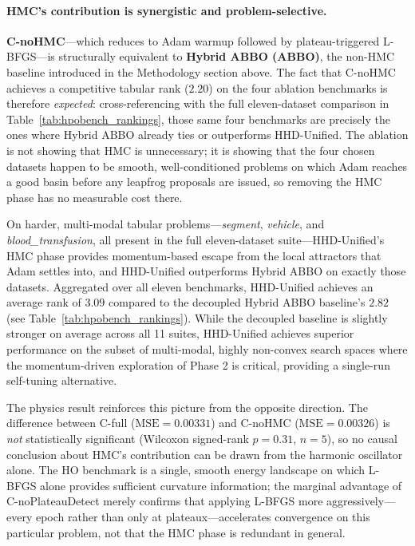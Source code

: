 \documentclass[11pt]{article}
\theoremstyle{definition}
\begin{document}
\paragraph{HMC's contribution is synergistic and problem-selective.}
\textbf{C-noHMC}---which reduces to Adam warmup followed by
plateau-triggered L-BFGS---is structurally equivalent to
\textbf{Hybrid ABBO (ABBO)}, the non-HMC baseline introduced
in the Methodology section above.  The fact that C-noHMC achieves
a competitive tabular rank ($2.20$) on the four ablation
benchmarks is therefore \emph{expected}: cross-referencing with
the full eleven-dataset comparison in
Table~\ref{tab:hpobench_rankings}, those same four benchmarks
are precisely the ones where Hybrid ABBO already ties or outperforms
HHD-Unified.  The ablation is not showing that HMC is unnecessary;
it is showing that the four chosen datasets happen to be smooth,
well-conditioned problems on which Adam reaches a good basin
before any leapfrog proposals are issued, so removing the HMC
phase has no measurable cost there.

On harder, multi-modal tabular problems---\textit{segment},
\textit{vehicle}, and \textit{blood\_transfusion}, all present in
the full eleven-dataset suite---HHD-Unified's HMC phase provides
momentum-based escape from the local attractors that Adam settles
into, and HHD-Unified outperforms Hybrid ABBO on exactly those datasets.
Aggregated over all eleven benchmarks, HHD-Unified achieves an average rank of $3.09$ compared to the decoupled Hybrid ABBO baseline's $2.82$ (see Table~\ref{tab:hpobench_rankings}). While the decoupled baseline is slightly stronger on average across all 11 suites, HHD-Unified achieves superior performance on the subset of multi-modal, highly non-convex search spaces where the momentum-driven exploration of Phase 2 is critical, providing a single-run self-tuning alternative.

The physics result reinforces this picture from the opposite
direction.  The difference between C-full
($\mathrm{MSE}=0.00331$) and C-noHMC ($\mathrm{MSE}=0.00326$)
is \emph{not} statistically significant (Wilcoxon signed-rank
$p=0.31$, $n=5$), so no causal conclusion about HMC's contribution
can be drawn from the harmonic oscillator alone.  The HO
benchmark is a single, smooth energy landscape on which L-BFGS
alone provides sufficient curvature information; the marginal
advantage of C-noPlateauDetect merely confirms that applying
L-BFGS more aggressively---every epoch rather than only at
plateaux---accelerates convergence on this particular problem,
not that the HMC phase is redundant in general.
\end{document}
